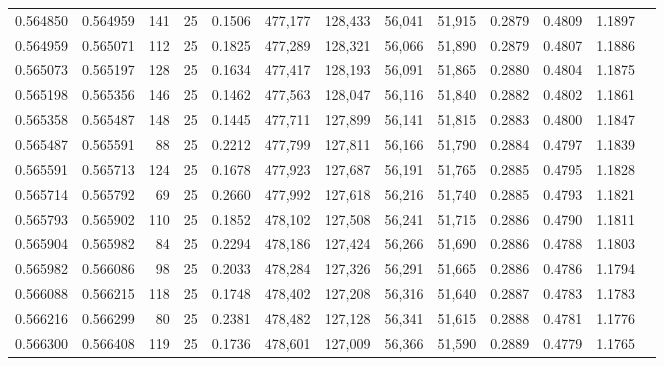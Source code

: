 \begin{tabular}{rrrrrrrrrrrrr}
0.564850 & 0.564959 &   141 &  25 &                                     0.1506 & 477,177 & 128,433 &  56,041 &  51,915 & 0.2879 & 0.4809 & 1.1897 \\
0.564959 & 0.565071 &   112 &  25 &                                     0.1825 & 477,289 & 128,321 &  56,066 &  51,890 & 0.2879 & 0.4807 & 1.1886 \\
0.565073 & 0.565197 &   128 &  25 &                                     0.1634 & 477,417 & 128,193 &  56,091 &  51,865 & 0.2880 & 0.4804 & 1.1875 \\
0.565198 & 0.565356 &   146 &  25 &                                     0.1462 & 477,563 & 128,047 &  56,116 &  51,840 & 0.2882 & 0.4802 & 1.1861 \\
0.565358 & 0.565487 &   148 &  25 &                                     0.1445 & 477,711 & 127,899 &  56,141 &  51,815 & 0.2883 & 0.4800 & 1.1847 \\
0.565487 & 0.565591 &    88 &  25 &                                     0.2212 & 477,799 & 127,811 &  56,166 &  51,790 & 0.2884 & 0.4797 & 1.1839 \\
0.565591 & 0.565713 &   124 &  25 &                                     0.1678 & 477,923 & 127,687 &  56,191 &  51,765 & 0.2885 & 0.4795 & 1.1828 \\
0.565714 & 0.565792 &    69 &  25 &                                     0.2660 & 477,992 & 127,618 &  56,216 &  51,740 & 0.2885 & 0.4793 & 1.1821 \\
0.565793 & 0.565902 &   110 &  25 &                                     0.1852 & 478,102 & 127,508 &  56,241 &  51,715 & 0.2886 & 0.4790 & 1.1811 \\
0.565904 & 0.565982 &    84 &  25 &                                     0.2294 & 478,186 & 127,424 &  56,266 &  51,690 & 0.2886 & 0.4788 & 1.1803 \\
0.565982 & 0.566086 &    98 &  25 &                                     0.2033 & 478,284 & 127,326 &  56,291 &  51,665 & 0.2886 & 0.4786 & 1.1794 \\
0.566088 & 0.566215 &   118 &  25 &                                     0.1748 & 478,402 & 127,208 &  56,316 &  51,640 & 0.2887 & 0.4783 & 1.1783 \\
0.566216 & 0.566299 &    80 &  25 &                                     0.2381 & 478,482 & 127,128 &  56,341 &  51,615 & 0.2888 & 0.4781 & 1.1776 \\
0.566300 & 0.566408 &   119 &  25 &                                     0.1736 & 478,601 & 127,009 &  56,366 &  51,590 & 0.2889 & 0.4779 & 1.1765 \\

\end{tabular}
